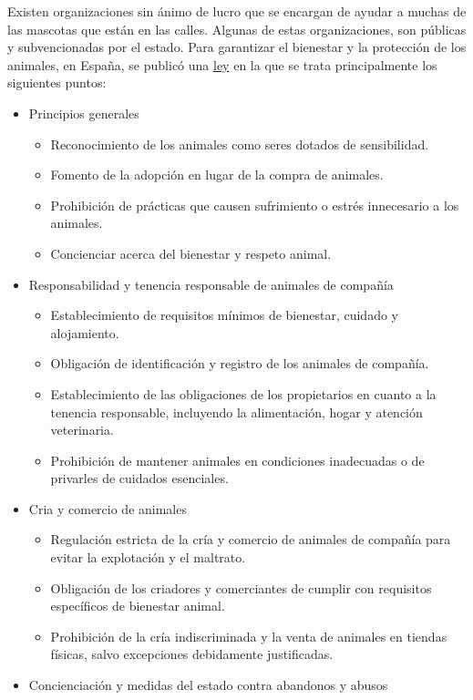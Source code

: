 \documentclass[a4paper, 12pt]{article}
\begin{document}
Existen organizaciones sin ánimo de lucro que se encargan de ayudar a muchas de las mascotas que están en las calles. Algunas de estas organizaciones, son públicas y subvencionadas por el estado. Para garantizar el bienestar y la protección de los animales, en España, se publicó una \href{https://www.boe.es/buscar/doc.php?id=BOE-A-2023-7936}{ley} en la que se trata principalmente los siguientes puntos:
\begin{itemize}
\item Principios generales
	\begin{itemize}
	\item Reconocimiento de los animales como seres dotados de sensibilidad.
	\item Fomento de la adopción en lugar de la compra de animales.
	\item Prohibición de prácticas que causen sufrimiento o estrés innecesario a los animales.
	\item Concienciar acerca del bienestar y respeto animal.
	\end{itemize}
\item Responsabilidad y tenencia responsable de animales de compañía
	\begin{itemize}
	\item Establecimiento de requisitos mínimos de bienestar, cuidado y alojamiento.
	\item Obligación de identificación y registro de los animales de compañía.
	\item Establecimiento de las obligaciones de los propietarios en cuanto a la tenencia responsable, incluyendo la alimentación, hogar y atención veterinaria.
	\item Prohibición de mantener animales en condiciones inadecuadas o de privarles de cuidados esenciales.
	\end{itemize}
\item Cria y comercio de animales
	\begin{itemize}
	\item Regulación estricta de la cría y comercio de animales de compañía para evitar la explotación y el maltrato.
	\item Obligación de los criadores y comerciantes de cumplir con requisitos específicos de bienestar animal.
	\item Prohibición de la cría indiscriminada y la venta de animales en tiendas físicas, salvo excepciones debidamente justificadas.
	\end{itemize}
\item Concienciación y medidas del estado contra abandonos y abusos

\end{itemize}
\end{document}
